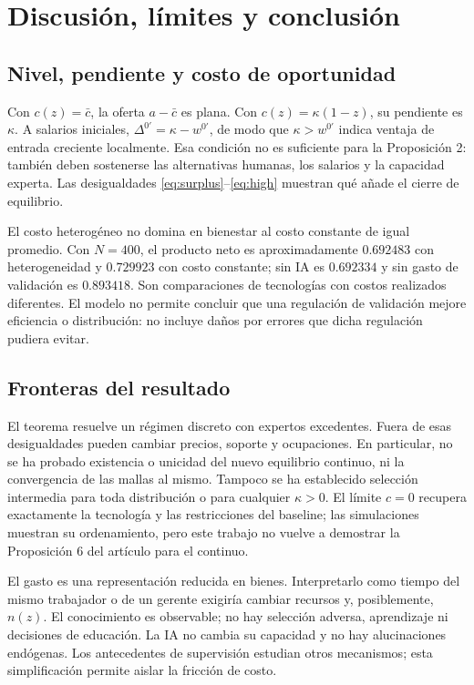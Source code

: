 \documentclass[11pt]{article}
\begin{document}
\section{Discusión, límites y conclusión}\label{sec:discussion}
\subsection{Nivel, pendiente y costo de oportunidad}
Con $c(z)=\bar c$, la oferta $a-\bar c$ es plana. Con $c(z)=\kappa(1-z)$, su pendiente es $\kappa$. A salarios iniciales, $\Delta^{0\prime}=\kappa-w^{0\prime}$, de modo que $\kappa>w^{0\prime}$ indica ventaja de entrada creciente localmente. Esa condición no es suficiente para la Proposición 2: también deben sostenerse las alternativas humanas, los salarios y la capacidad experta. Las desigualdades \eqref{eq:surplus}--\eqref{eq:high} muestran qué añade el cierre de equilibrio.

El costo heterogéneo no domina en bienestar al costo constante de igual promedio. Con $N=400$, el producto neto es aproximadamente $0.692483$ con heterogeneidad y $0.729923$ con costo constante; sin IA es $0.692334$ y sin gasto de validación es $0.893418$. Son comparaciones de tecnologías con costos realizados diferentes. El modelo no permite concluir que una regulación de validación mejore eficiencia o distribución: no incluye daños por errores que dicha regulación pudiera evitar.

\subsection{Fronteras del resultado}
El teorema resuelve un régimen discreto con expertos excedentes. Fuera de esas desigualdades pueden cambiar precios, soporte y ocupaciones. En particular, no se ha probado existencia o unicidad del nuevo equilibrio continuo, ni la convergencia de las mallas al mismo. Tampoco se ha establecido selección intermedia para toda distribución o para cualquier $\kappa>0$. El límite $c=0$ recupera exactamente la tecnología y las restricciones del baseline; las simulaciones muestran su ordenamiento, pero este trabajo no vuelve a demostrar la Proposición 6 del artículo para el continuo.

El gasto es una representación reducida en bienes. Interpretarlo como tiempo del mismo trabajador o de un gerente exigiría cambiar recursos y, posiblemente, $n(z)$. El conocimiento es observable; no hay selección adversa, aprendizaje ni decisiones de educación. La IA no cambia su capacidad y no hay alucinaciones endógenas. Los antecedentes de supervisión estudian otros mecanismos; esta simplificación permite aislar la fricción de costo.
\end{document}
